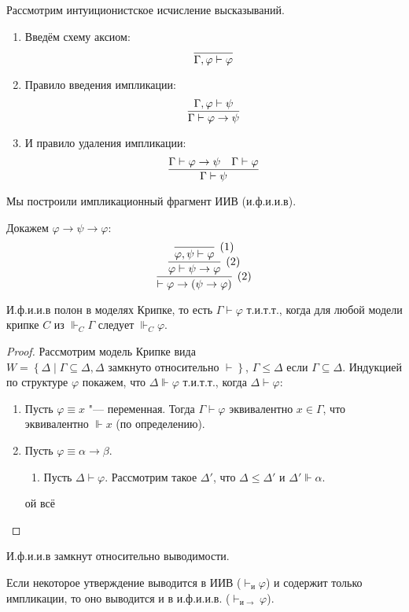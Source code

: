 \begin{definition}
    Рассмотрим интуиционистское исчисление высказываний.
    \begin{enumerate}
        \item Введём схему аксиом:
        \[
            \infer{\Gamma, \varphi \vdash \varphi}{}
        \]
        \item Правило введения импликации:
        \[
            \infer{\Gamma \vdash \varphi \rightarrow \psi}{\Gamma, \varphi \vdash \psi}
        \]
        \item И правило удаления импликации:
        \[
            \infer{\Gamma \vdash \psi}{\Gamma \vdash \varphi \rightarrow \psi & \Gamma \vdash \varphi}
        \]
    \end{enumerate}

    Мы построили импликационный фрагмент ИИВ (и.ф.и.и.в).
\end{definition}

\begin{example} Докажем $\varphi \rightarrow \psi \rightarrow \varphi$:
\[
    \infer[(2)]
        { \vdash \varphi \rightarrow (\psi \rightarrow \varphi) }
        { \infer[(2)]
            { \varphi \vdash \psi \rightarrow \varphi }
            { \infer[(1)]
                { \varphi, \psi \vdash \varphi}
                {}
            }
        }
\]
\end{example}

\begin{theorem}
    И.ф.и.и.в полон в моделях Крипке, то есть $\Gamma \vdash \varphi$ т.и.т.т.,
    когда для любой модели крипке $C$ из $\Vdash_C \Gamma$ следует $\Vdash_C \varphi$.
\end{theorem}

\begin{proof}
    Рассмотрим модель Крипке вида $W = \left\{\Delta \mid \Gamma \subseteq \Delta, \Delta\text{ замкнуто относительно }\vdash\right\}$,
    $\Gamma \leq \Delta$ если $\Gamma \subseteq \Delta$.
    Индукцией по структуре $\varphi$ покажем, что $\Delta \Vdash \varphi$ т.и.т.т., когда $\Delta \vdash \varphi$:
    \begin{enumerate}
        \item Пусть $\varphi \equiv x$ "--- переменная. Тогда $\Gamma \vdash \varphi$ эквивалентно $x \in \Gamma$, что эквивалентно $\Vdash x$ (по определению).
        \item Пусть $\varphi \equiv \alpha \rightarrow \beta$.
        \begin{enumerate}[label=(\asbuk*)]
            \item Пусть $\Delta \vdash \varphi$.
            Рассмотрим такое $\Delta'$, что $\Delta \leq \Delta'$ и $\Delta' \Vdash \alpha$.
        \end{enumerate}
        ой всё \todo
    \end{enumerate}
\end{proof}

\begin{corollary}
    И.ф.и.и.в замкнут относительно выводимости.
\end{corollary}
Если некоторое утверждение выводится в ИИВ ($\vdash_{и} \varphi$) и содержит только импликации,
то оно выводится и в и.ф.и.и.в. ($\vdash_{и \rightarrow} \varphi$).
